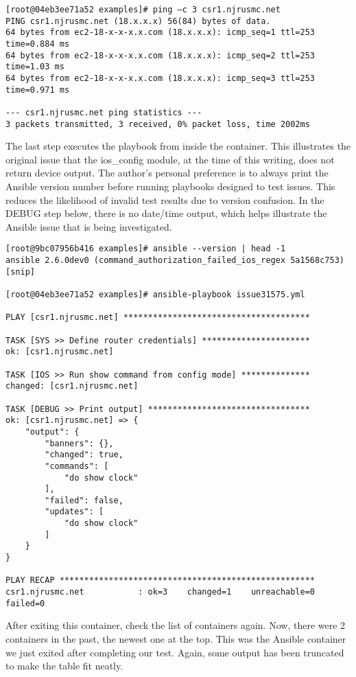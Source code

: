 \begin{verbatim}
[root@04eb3ee71a52 examples]# ping –c 3 csr1.njrusmc.net
PING csr1.njrusmc.net (18.x.x.x) 56(84) bytes of data.
64 bytes from ec2-18-x-x-x.x.com (18.x.x.x): icmp_seq=1 ttl=253 time=0.884 ms
64 bytes from ec2-18-x-x-x.x.com (18.x.x.x): icmp_seq=2 ttl=253 time=1.03 ms
64 bytes from ec2-18-x-x-x.x.com (18.x.x.x): icmp_seq=3 ttl=253 time=0.971 ms

--- csr1.njrusmc.net ping statistics ---
3 packets transmitted, 3 received, 0% packet loss, time 2002ms
\end{verbatim}

The last step executes the playbook from inside the container. This
illustrates the original issue that the ios\_config module, at the time of this
writing, does not return device output. The author's personal preference is to
always print the Ansible version number before running playbooks designed to
test issues. This reduces the likelihood of invalid test results due to
version confusion. In the DEBUG step below, there is no date/time output,
which helps illustrate the Ansible issue that is being investigated.

\begin{verbatim}
[root@9bc07956b416 examples]# ansible --version | head -1
ansible 2.6.0dev0 (command_authorization_failed_ios_regex 5a1568c753) [snip]

[root@04eb3ee71a52 examples]# ansible-playbook issue31575.yml 

PLAY [csr1.njrusmc.net] **************************************

TASK [SYS >> Define router credentials] **********************
ok: [csr1.njrusmc.net]

TASK [IOS >> Run show command from config mode] **************
changed: [csr1.njrusmc.net]

TASK [DEBUG >> Print output] *********************************
ok: [csr1.njrusmc.net] => {
    "output": {
        "banners": {}, 
        "changed": true, 
        "commands": [
            "do show clock"
        ], 
        "failed": false, 
        "updates": [
            "do show clock"
        ]
    }
}

PLAY RECAP ****************************************************
csr1.njrusmc.net           : ok=3    changed=1    unreachable=0    failed=0   
\end{verbatim}

After exiting this container, check the list of containers again. Now, there
were 2 containers in the past, the newest one at the top. This was the Ansible
container we just exited after completing our test. Again, some output has
been truncated to make the table fit neatly.

